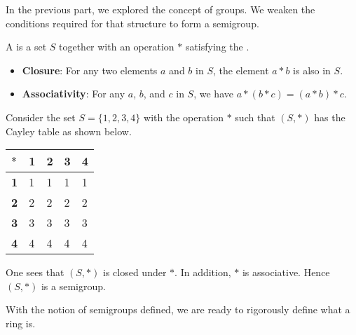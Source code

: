 In the previous part, we explored the concept of groups. We weaken the conditions required for that structure to form a semigroup.
\begin{definition}
    A  is a set $S$ together with an operation $\ast$ satisfying the .
    \begin{itemize}
        \item \textbf{Closure}: For any two elements $a$ and $b$ in $S$, the element $a\ast b$ is also in $S$.
        \item \textbf{Associativity}: For any $a$, $b$, and $c$ in $S$, we have $a \ast (b \ast c) = (a \ast b) \ast c$.
    \end{itemize}
\end{definition}
\begin{example}
    Consider the set $S = \{1, 2, 3, 4\}$ with the operation $\ast$ such that $(S, \ast)$ has the Cayley table as shown below.
    \begin{table}[h]
        \centering
        \begin{tabular}{|l|l|l|l|l|}
            \hline
            $\ast$     & \textbf{1} & \textbf{2} & \textbf{3} & \textbf{4} \\ \hline
            \textbf{1} & 1          & 1          & 1          & 1          \\ \hline
            \textbf{2} & 2          & 2          & 2          & 2          \\ \hline
            \textbf{3} & 3          & 3          & 3          & 3          \\ \hline
            \textbf{4} & 4          & 4          & 4          & 4          \\ \hline
        \end{tabular}
    \end{table}

    One sees that $(S, \ast)$ is closed under $\ast$. In addition, $\ast$ is associative. Hence $(S, \ast)$ is a semigroup.
\end{example}

With the notion of semigroups defined, we are ready to rigorously define what a ring is.

